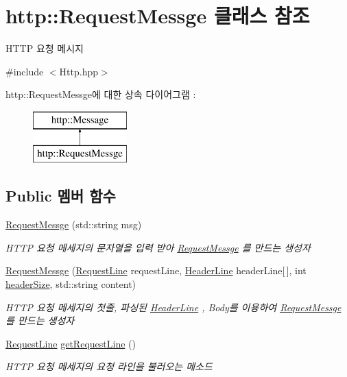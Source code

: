 \hypertarget{classhttp_1_1_request_messge}{}\section{http\+:\+:Request\+Messge 클래스 참조}
\label{classhttp_1_1_request_messge}


H\+T\+TP 요청 메시지  




{\ttfamily \#include $<$Http.\+hpp$>$}

http\+:\+:Request\+Messge에 대한 상속 다이어그램 \+: \begin{figure}[H]
\begin{center}
\leavevmode
\includegraphics[height=2.000000cm]{classhttp_1_1_request_messge}
\end{center}
\end{figure}
\subsection*{Public 멤버 함수}
\begin{DoxyCompactItemize}
\item 
\hyperlink{classhttp_1_1_request_messge_aa79dcaf03eb6c49010e5df0c75fb3740}{Request\+Messge} (std\+::string msg)
\begin{DoxyCompactList}\small\item\em H\+T\+TP 요청 메세지의 문자열을 입력 받아 \hyperlink{classhttp_1_1_request_messge}{Request\+Messge} 를 만드는 생성자 \end{DoxyCompactList}\item 
\hyperlink{classhttp_1_1_request_messge_a8b9e3bc54bc34d1ec19cf4253057444b}{Request\+Messge} (\hyperlink{structhttp_1_1_request_line}{Request\+Line} request\+Line, \hyperlink{structhttp_1_1_header_line}{Header\+Line} header\+Line\mbox{[}$\,$\mbox{]}, int \hyperlink{classhttp_1_1_message_abf4fab93257b3d37930ed20627f1c061}{header\+Size}, std\+::string content)
\begin{DoxyCompactList}\small\item\em H\+T\+TP 요청 메세지의 첫줄, 파싱된 \hyperlink{structhttp_1_1_header_line}{Header\+Line} , Body를 이용하여 \hyperlink{classhttp_1_1_request_messge}{Request\+Messge} 를 만드는 생성자 \end{DoxyCompactList}\item 
\hyperlink{structhttp_1_1_request_line}{Request\+Line} \hyperlink{classhttp_1_1_request_messge_a6a9c5ce3a93c6949241527d315f4bb17}{get\+Request\+Line} ()
\begin{DoxyCompactList}\small\item\em H\+T\+TP 요청 메세지의 요청 라인을 불러오는 메소드 \end{DoxyCompactList}\end{DoxyCompactItemize}
